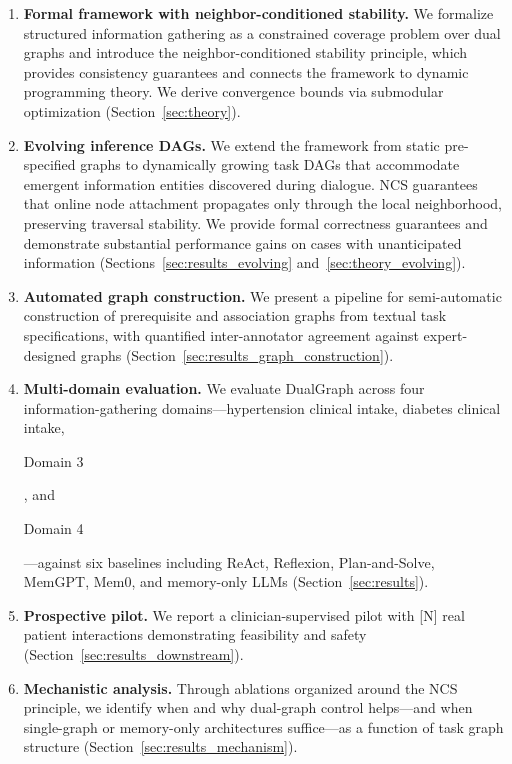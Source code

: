 \documentclass[11pt,a4paper]{article}
\newcommand{\placeholder}[1]{%
  \begin{tcolorbox}[colback=yellow!10,colframe=orange!60!black,
    fonttitle=\bfseries,title=Placeholder]
    #1
  \end{tcolorbox}%
}
\begin{document}
\begin{enumerate}
  \item \textbf{Formal framework with neighbor-conditioned stability.} We
        formalize structured information gathering as a constrained coverage
        problem over dual graphs and introduce the neighbor-conditioned
        stability principle, which provides consistency guarantees and
        connects the framework to dynamic programming theory. We derive
        convergence bounds via submodular optimization
        (Section~\ref{sec:theory}).
  \item \textbf{Evolving inference DAGs.} We extend the framework from
        static pre-specified graphs to dynamically growing task DAGs that
        accommodate emergent information entities discovered during dialogue.
        NCS guarantees that online node attachment propagates only through
        the local neighborhood, preserving traversal stability. We provide
        formal correctness guarantees and demonstrate substantial performance
        gains on cases with unanticipated information
        (Sections~\ref{sec:results_evolving} and~\ref{sec:theory_evolving}).
  \item \textbf{Automated graph construction.} We present a pipeline for
        semi-automatic construction of prerequisite and association graphs
        from textual task specifications, with quantified inter-annotator
        agreement against expert-designed graphs
        (Section~\ref{sec:results_graph_construction}).
  \item \textbf{Multi-domain evaluation.} We evaluate DualGraph across four
        information-gathering domains---hypertension clinical intake, diabetes
        clinical intake, \placeholder{Domain 3}, and \placeholder{Domain
        4}---against six baselines including ReAct, Reflexion, Plan-and-Solve,
        MemGPT, Mem0, and memory-only LLMs (Section~\ref{sec:results}).
  \item \textbf{Prospective pilot.} We report a clinician-supervised pilot
        with [N] real patient interactions demonstrating feasibility and safety
        (Section~\ref{sec:results_downstream}).
  \item \textbf{Mechanistic analysis.} Through ablations organized around
        the NCS principle, we identify when and why dual-graph control
        helps---and when single-graph or memory-only architectures
        suffice---as a function of task graph structure
        (Section~\ref{sec:results_mechanism}).
\end{enumerate}
\end{document}
